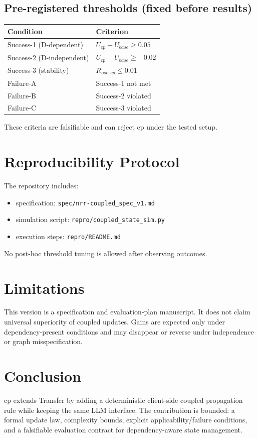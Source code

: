 \documentclass[11pt,a4paper]{article}
\begin{document}
\subsection{Pre-registered thresholds (fixed before results)}
\begin{center}
\begin{tabular}{@{}ll@{}}
\toprule
Condition & Criterion \\
\midrule
Success-1 (D-dependent) & $U_{cp} - U_{base} \ge 0.05$ \\
Success-2 (D-independent) & $U_{cp} - U_{base} \ge -0.02$ \\
Success-3 (stability) & $R_{osc,cp} \le 0.01$ \\
Failure-A & Success-1 not met \\
Failure-B & Success-2 violated \\
Failure-C & Success-3 violated \\
\bottomrule
\end{tabular}
\end{center}

These criteria are falsifiable and can reject cp under the tested setup.

\section{Reproducibility Protocol}
The repository includes:
\begin{itemize}
  \item specification: \texttt{spec/nrr-coupled\_spec\_v1.md}
  \item simulation script: \texttt{repro/coupled\_state\_sim.py}
  \item execution steps: \texttt{repro/README.md}
\end{itemize}

No post-hoc threshold tuning is allowed after observing outcomes.

\section{Limitations}
This version is a specification and evaluation-plan manuscript. It does not claim universal superiority of coupled updates. Gains are expected only under dependency-present conditions and may disappear or reverse under independence or graph misspecification.

\section{Conclusion}
cp extends Transfer by adding a deterministic client-side coupled propagation rule while keeping the same LLM interface. The contribution is bounded: a formal update law, complexity bounds, explicit applicability/failure conditions, and a falsifiable evaluation contract for dependency-aware state management.
\end{document}
